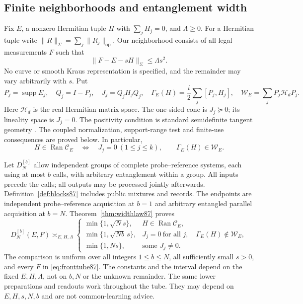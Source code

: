 \subsection{Finite neighborhoods and entanglement width}
Fix $E$, a nonzero Hermitian tuple $H$ with $\sum_jH_j=0$, and
$\Lambda\ge0$.  For a Hermitian tuple write
$\|R\|_\Sigma=\sum_j\|R_j\|_{\mathrm{op}}$.  Our neighborhood
consists of all legal measurements $F$ such that
\begin{equation}\label{eq:fronttube87}
 \|F-E-sH\|_\Sigma\le\Lambda s^2.
\end{equation}
No curve or smooth Kraus representation is specified, and the
remainder may vary arbitrarily with $s$.  Put
\[
 P_j=\operatorname{supp}E_j,\quad Q_j=I-P_j,\quad
 J_j=Q_jH_jQ_j,\quad
 \Gamma_E(H)=\frac i2\sum_j[P_j,H_j],\quad
 \mathcal W_E=\sum_jP_j\mathcal H_dP_j.
\]
Here $\mathcal H_d$ is the real Hermitian matrix space.  The
one-sided cone is $J_j\succeq0$; its lineality space is $J_j=0$.
The positivity condition is standard semidefinite tangent geometry
\cite{BCS87}.  The coupled normalization, support-range test and
finite-use consequences are proved below.  In particular,
\[
 H\in\operatorname{Ran}\mathcal C_E
 \quad\Longleftrightarrow\quad
 J_j=0\ (1\le j\le k),\qquad \Gamma_E(H)\in\mathcal W_E.
\]

Let $D_N^{[b]}$ allow independent groups of complete probe--reference
systems, each using at most $b$ calls, with arbitrary entanglement
within a group.  All inputs precede the calls; all outputs may be
processed jointly afterwards.  Definition~\ref{def:blocks87} includes
public mixtures and records.  The endpoints are independent
probe--reference acquisition at $b=1$ and arbitrary entangled
parallel acquisition at $b=N$.  Theorem~\ref{thm:widthlaw87} proves
\begin{equation}\label{eq:frontwidth87}
 D_N^{[b]}(E,F)\asymp_{E,H,\Lambda}
 \begin{cases}
 \min\{1,\sqrt N s\},&H\in\operatorname{Ran}\mathcal C_E,\\
 \min\{1,\sqrt{Nb}\,s\},&J_j=0\ \text{for all }j,
                        \quad\Gamma_E(H)\notin\mathcal W_E,\\
 \min\{1,Ns\},&\text{some }J_j\ne0.
 \end{cases}
\end{equation}
The comparison is uniform over all integers $1\le b\le N$,
all sufficiently small $s>0$, and every $F$ in
\eqref{eq:fronttube87}.  The constants and the interval depend on
the fixed $E,H,\Lambda$, not on $b,N$ or the unknown remainder.
The same lower preparations and readouts work throughout the tube.
They may depend on $E,H,s,N,b$ and are not common-learning advice.

